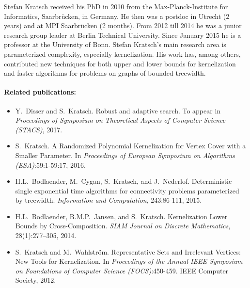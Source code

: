 \documentclass[a4paper,10pt]{article}
\begin{document}
Stefan Kratsch received his PhD in 2010 from the Max-Planck-Institute for Informatics, Saarbr\"ucken, in Germany. He then was a postdoc in Utrecht (2 years) and at MPI Saarbr\"ucken (2 months). From 2012 till 2014 he was a junior research group leader at Berlin Technical University. Since January 2015 he is a professor at the University of Bonn.
Stefan Kratsch's main research area is parameterized complexity, especially kernelization. His work has, among others, contributed new techniques for both upper and lower bounds for kernelization and faster algorithms for problems on graphs of bounded treewidth. 

\paragraph{Related publications:}
\begin{itemize}
\item Y.~Disser and S.~Kratsch. Robust and adaptive search. To appear in \emph{Proceedings of Symposium on Theoretical Aspects of Computer Science (STACS)}, 2017.
\item S.~Kratsch. A Randomized Polynomial Kernelization for Vertex Cover with a Smaller Parameter. \newblock In \emph{Proceedings of European Symposium on Algorithms (ESA)}:59:1-59:17, 2016.
\item H.L.~Bodlaender, M.~Cygan, S.~Kratsch, and J.~Nederlof. \newblock Deterministic single exponential time algorithms for connectivity problems parameterized by treewidth. \newblock \emph{Information and Computation}, 243:86-111, 2015.
\item H.L.~Bodlaender, B.M.P.~Jansen, and S.~Kratsch. \newblock Kernelization Lower Bounds by Cross-Composition. \newblock \emph{{SIAM} Journal on Discrete Mathematics}, 28(1):277--305, 2014.
\item S.~Kratsch and M.~Wahlstr\"om. \newblock Representative Sets and Irrelevant Vertices: New Tools for Kernelization. \newblock In \emph{Proceedings of the Annual IEEE Symposium on Foundations of
  Computer Science (FOCS)}:450-459. IEEE Computer Society, 2012.
\end{itemize}
\end{document}
